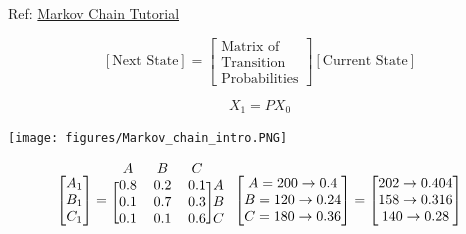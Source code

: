 \documentclass[letterpaper, 10.5pt,landscape]{article}
\begin{document}
\begin{multicols*}{3}
Ref: \href{https://www.youtube.com/playlist?list=PLX2gX-ftPVXWgcF0WATMDr-AfvfaYjJZ3}{Markov Chain Tutorial}

\vspace{-3pt}
\[\boxed{\left[\text{Next State}\right] = 
\begin{bmatrix}
\text{Matrix of}\\
\text{Transition}  \\
\text{Probabilities}
\end{bmatrix}
\left[\text{Current State} \right]
}\]

\[X_{1} = PX_{0}\]

\vspace{-3pt}
\begin{center}
    \begin{minipage}{0.6\linewidth}
    \texttt{[image: figures/Markov\_chain\_intro.PNG]}
    \end{minipage}
\end{center}


\vspace{-5pt}
\[ \begin{bmatrix}
A_{1} \\
B_{1} \\
C_{1}
\end{bmatrix} = 
\begin{blockarray}{cccc}
A & B & C \\
\begin{block}{[ccc]c}
  0.8 & 0.2 & 0.1 & \hspace{-7pt}A \\
  0.1 & 0.7 & 0.3 & \hspace{-7pt}B \\
  0.1 & 0.1 & 0.6 & \hspace{-7pt}C \\
\end{block}
\end{blockarray}
\begin{bmatrix}
A = 200 \rightarrow 0.4 \\
B = 120 \rightarrow 0.24\\
C = 180 \rightarrow 0.36
\end{bmatrix}
=  \begin{bmatrix}
202 \rightarrow 0.404 \\
158 \rightarrow 0.316 \\
140 \rightarrow 0.28
\end{bmatrix}
\]




\end{multicols*}
\end{document}
